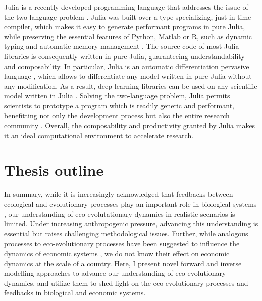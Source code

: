 Julia is a recently developed programming language that addresses the issue of the two-language problem \citep{Bezanson2017,Bezanson2018}. Julia was built over a type-specializing, just-in-time compiler, which makes it easy to generate performant programs in pure Julia, while preserving the essential features of Python, Matlab or R, such as dynamic typing and automatic memory management \citep{Perkel2019}. 
% 
The source code of most Julia libraries is consequently written in pure Julia, guaranteeing understandability and composability.
% 
In particular, Julia is an automatic differentiation pervasive language \citep{Innes2019}, which allows to differentiate any model written in pure Julia without any modification. As a result, deep learning libraries can be used on any scientific model written in Julia \citep{Rackauckas2020a}.
% 
Solving the two-language problem, Julia permits scientists to prototype a program which is readily generic and performant, benefitting not only the development process but also the entire research community \citep{Bezanson2017}.
% 
% 
Overall, the composability and productivity granted by Julia makes it an ideal computational environment to accelerate research. 

\section{Thesis outline}

In summary, while it is increasingly acknowledged that feedbacks between ecological and evolutionary processes play an important role in biological systems \citep{Pelletier2009, Urban2016}, our understanding of eco-evolutationary dynamics in realistic scenarios is limited.
% 
Under increasing anthropogenic pressure, advancing this understanding is essential \citep{Urban2016} but raises challenging methodological issues.
% 
Further, while analogous processes to eco-evolutionary processes have been suggested to influence the dynamics of economic systems \citep{Hodgson2019}, we do not know their effect on economic dynamics at the scale of a country.
% 
Here, I present novel forward and inverse modelling approaches to advance our understanding of eco-evolutionary dynamics, and utilize them to shed light on the eco-evolutionary processes and feedbacks in biological and economic systems.


